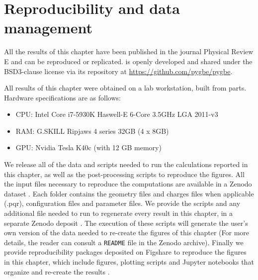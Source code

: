 \section{Reproducibility and data management} \label{sec:repro_lspr}

All the results of this chapter have been published in the journal 
Physical Review E \cite{ClementiETal2019} and can be reproduced or replicated. \pygbe is openly developed and 
shared under the BSD3-clause license via its repository at \url{https://github.com/pygbe/pygbe}.

All results of this chapter were obtained on a lab workstation, built from parts. Hardware specifications are as follows:

\begin{itemize}
  \item CPU: Intel Core i7-5930K Haswell-E 6-Core 3.5GHz LGA 2011-v3
  \item RAM: G.SKILL Ripjaws 4 series 32GB (4 x 8GB)
  \item GPU: Nvidia Tesla K40c (with 12 GB memory)
\end{itemize}

We release all of the data and scripts needed to run the calculations reported in this chapter, 
as well as the post-processing scripts to reproduce the figures. 
All the input files necessary to reproduce the computations are available in a Zenodo dataset \cite{ClementiETal2018a}. 
Each folder contains the geometry files and charges files when applicable (.pqr), configuration files and parameter files.
We provide the scripts and any additional file needed to run \pygbe to regenerate every result in this chapter, in a 
separate Zenodo deposit \cite{ClementiETal2018b}. The execution of these scripts will generate the user's own version of the data 
needed to re-create the figures of this chapter (For more details, the reader can consult a \texttt{README} file in the Zenodo archive).
Finally we provide reproducibility packages deposited on Figshare to reproduce the figures in this chapter, which include 
figures, plotting scripts and Jupyter notebooks that organize and re-create the results 
\cite{ClementiETal2018c,ClementiETal2018d,ClementiETal2018e,ClementiETal2018f}.

